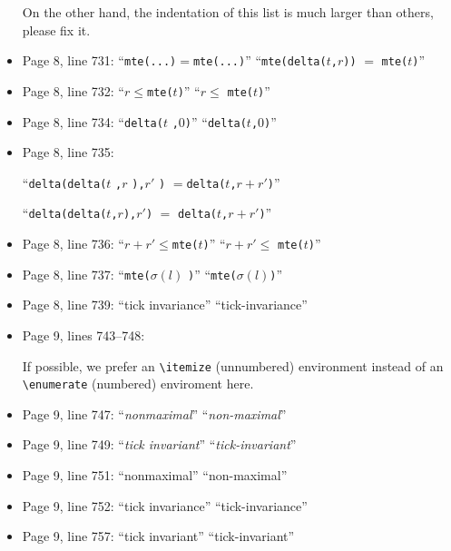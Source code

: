 \documentclass[12pt,onecolumn]{IEEEtranTIE}
\begin{document}
\begin{itemize}
On the other hand, the indentation of this list is much larger than
others, please fix it.

\item Page 8, line 731: ``\verb|mte(...)|$=$\verb|mte(...)|'' \by
  ``\verb|mte(delta(|$t$\verb|,|$r$\verb|))| $=$
  \verb|mte(|$t$\verb|)|''

\item Page 8, line 732: ``$r\le$\verb|mte(|$t$\verb|)|'' \by ``$r\le$
  \verb|mte(|$t$\verb|)|''

\item Page 8, line 734: ``\verb|delta(|$t$ \verb|,|$0$\verb|)|'' \by
  ``\verb|delta(|$t$\verb|,|$0$\verb|)|''

\item Page 8, line 735:

``\verb|delta(delta(|$t$ \verb|,|$r$ \verb|),|$r'$ \verb|)|
  $=$\verb|delta(|$t$\verb|,|$r+r'$\verb|)|''

\by
  
``\verb|delta(delta(|$t$\verb|,|$r$\verb|),|$r'$\verb|)| $=$
\verb|delta(|$t$\verb|,|$r+r'$\verb|)|''

\item Page 8, line 736: ``$r+r'\le$\verb|mte(|$t$\verb|)|'' \by
  ``$r+r'\le$ \verb|mte(|$t$\verb|)|''

\item Page 8, line 737: ``\verb|mte(|$\sigma(l)$ \verb|)|'' \by
  ``\verb|mte(|$\sigma(l)$\verb|)|''

\item Page 8, line 739: ``tick invariance'' \by ``tick-invariance''

\item Page 9, lines 743--748:

If possible, we prefer an \verb|\itemize| (unnumbered) environment
instead of an \verb|\enumerate| (numbered) enviroment here.

\item Page 9, line 747: ``\emph{nonmaximal}'' \by
  ``\emph{non-maximal}''

\item Page 9, line 749: ``\emph{tick invariant}'' \by
  ``\emph{tick-invariant}''

\item Page 9, line 751: ``nonmaximal'' \by ``non-maximal''

\item Page 9, line 752: ``tick invariance'' \by ``tick-invariance''

\item Page 9, line 757: ``tick invariant'' \by ``tick-invariant''


\end{itemize}
\end{document}
